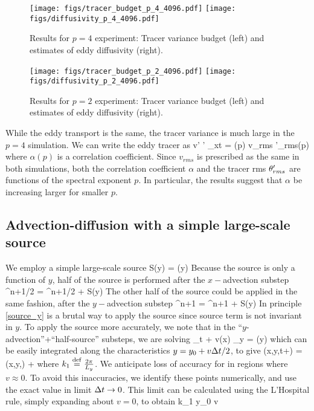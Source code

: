 \documentclass[11pt]{article}
\begin{document}
\begin{figure}[ht]
    \centering
       \texttt{[image: figs/tracer\_budget\_p\_4\_4096.pdf]}
       \texttt{[image: figs/diffusivity\_p\_4\_4096.pdf]}
       \caption{\small Results for $p=4$ experiment: Tracer variance budget (left) and estimates of eddy diffusivity (right).}
		    \label{VarianceBudgetp4}
\end{figure}

\begin{figure}[ht]
    \centering
       \texttt{[image: figs/tracer\_budget\_p\_2\_4096.pdf]}
       \texttt{[image: figs/diffusivity\_p\_2\_4096.pdf]}
       \caption{\small Results for $p=2$ experiment: Tracer variance budget (left) and estimates of eddy diffusivity (right).}
		    \label{VarianceBudgetp2}
\end{figure}


While the eddy transport is the same, the tracer variance is much large in the $p=4$ simulation. We can write
the eddy tracer as
\beq
\la v' \vth' \ra_{xt} = \alpha(p) v_{rms} \vth'_{rms}(p)\com
\eeq
where $\alpha(p)$ is a correlation coefficient. Since $v_{rms}$ is prescribed as the same in both simulations,
both the correlation coefficient $\alpha$ and the tracer rms $\theta'_{rms}$ are functions of the spectral
exponent $p$. In particular, the results suggest that $\alpha$ be increasing larger for smaller $p$.

\clearpage
\subsection{Advection-diffusion with a simple large-scale source}

We employ a simple large-scale source
\beq
S(y) = \cos \left(y\right)\per
\eeq
Because the source is only a function of $y$, half of the source is performed after the $x-$advection
substep
\beq
\label{source_x}
\vth^{n+1/2} = \vth^{n+1/2} +  S(y)\per
\eeq
The other half of the source could be applied in the same fashion, after the $y-$advection
substep
\beq
\label{source_y}
\vth^{n+1} = \vth^{n+1} +  S(y)\per
\eeq
In principle \eqref{source_y} is a brutal way to apply the source since source term is not invariant in $y$.
To apply the source more accurately, we note that in the ``$y$-advection''+``half-source'' substeps, we are
solving
\beq
\vth_t + v(x) \vth_y = \cos \left(y\right)\com
\eeq
which can be easily integrated along the characteristics $y = y_0 + v \Delta t/2$, to give
\beq
\label{adv_source_y}
\vth(x,y,t+\dt) = \vth(x,y,\dt) + \per
\eeq
where $k_1 \stackrel{\mathrm{def}}{=} \frac{2\pi}{L_y}$. We anticipate loss of accuracy for in regions where $v\approx 0$. To
avoid this inaccuracies, we identify these points numerically, and use the exact value in limit $\Delta t \to 0$.
This limit can be calculated using the L'Hospital rule, simply expanding about $v=0$, to obtain
\beq
{} \to {}\cos k_1 y_0 \qquad {}
\qquad v \per
\eeq
\end{document}
